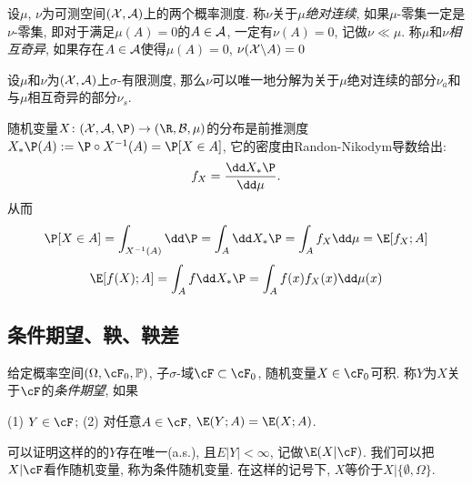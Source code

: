 设$\mu$, $\nu$为可测空间$(\mathcal{X}, \mathcal{A})$上的两个概率测度. 
称$\nu$关于$\mu$\emph{绝对连续}, 如果$\mu$-零集一定是$\nu$-零集, 即对于满足$\mu(A) = 0$的$A \in \mathcal{A}$, 一定有$\nu(A) = 0$, 记做$\nu \ll \mu$. 
称$\mu$和$\nu$\emph{相互奇异}, 如果存在$A \in \mathcal{A}$使得$\mu(A) = 0$, $\nu(\mathcal{X} \backslash A) = 0$

\begin{theorem}[Lebesgue分解定理]
	设$\mu$和$\nu$为$(\mathcal{X}, \mathcal{A})$上$\sigma$-有限测度, 那么$\nu$可以唯一地分解为关于$\mu$绝对连续的部分$\nu_a$和与$\mu$相互奇异的部分$\nu_s$. 
\end{theorem}

\begin{example}[分布的密度]
	随机变量$X \colon (\cX, \cA, \P) \to (\R, \cB, \mu)$的分布是前推测度$X_* \P (A) := \P \circ X^{-1} (A) = \P[X \in A]$, 它的密度由Randon-Nikodym导数给出: 
	\begin{equation*}
		f_X = \frac{\dd X_* \P}{\dd \mu}. 
	\end{equation*}
	从而
	\begin{equation*}
		\P[X \in A] 
		= \int_{X^{-1}(A)} \dd \P 
		= \int_A \dd X_* \P 
		= \int_A f_X \dd \mu
		= \E[f_X; A]
	\end{equation*}
	\begin{equation*}
		\E[f(X); A]
		= \int_A f \dd X_* \P 
		= \int_A f(x) f_X(x) \dd \mu(x)
	\end{equation*}
\end{example}

\subsection{条件期望、鞅、鞅差}

给定概率空间$(\Omega, \cF_0, \mathbb{P})$, 子$\sigma$-域$\cF \subset \cF_0$, 随机变量$X \in \cF_0$可积. 
称$Y$为$X$关于$\cF$的\emph{条件期望}, 如果
\begin{center}
	(1) $Y \in \cF$; \quad
	(2) 对任意$A \in \cF$, $\E(Y;A) = \E(X;A)$. 
\end{center}
可以证明这样的的$Y$存在唯一(a.s.), 且$E|Y| < \infty$, 记做$\E(X|\cF)$. 
我们可以把$X | \cF$看作随机变量, 称为条件随机变量. 
在这样的记号下, $X$等价于$X | \{\emptyset, \Omega\}$. 


